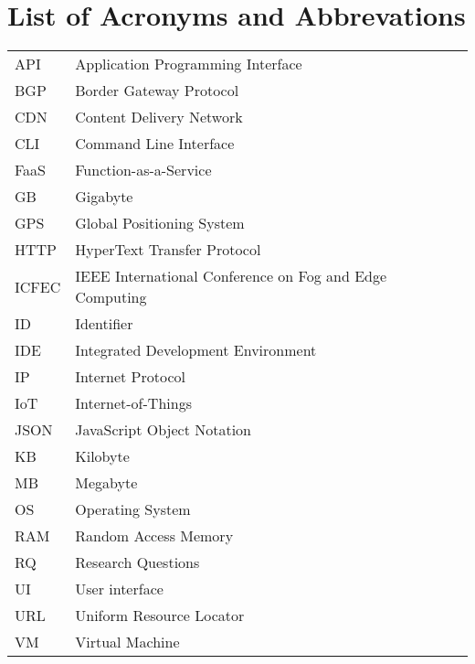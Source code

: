 \chapter*{List of Acronyms and Abbrevations}
\begin{table}[H]
\begin{tabular}{p{2cm}l}
API    & Application Programming Interface                         \\[5pt]
BGP    & Border Gateway Protocol                                   \\[5pt]
CDN    & Content Delivery Network                                  \\[5pt]
CLI    & Command Line Interface                                    \\[5pt]
FaaS   & Function-as-a-Service                                     \\[5pt]
GB     & Gigabyte                                                  \\[5pt]
GPS    & Global Positioning System                                 \\[5pt]
HTTP   & HyperText Transfer Protocol                               \\[5pt]
ICFEC  & IEEE International Conference on Fog and Edge Computing   \\[5pt]
ID     & Identifier                                                \\[5pt]
IDE    & Integrated Development Environment                        \\[5pt]
IP     & Internet Protocol                                         \\[5pt]
IoT    & Internet-of-Things                                        \\[5pt]
JSON   & JavaScript Object Notation                                \\[5pt]
KB     & Kilobyte                                                  \\[5pt]
MB     & Megabyte                                                  \\[5pt]
OS     & Operating System                                          \\[5pt]
RAM    & Random Access Memory                                      \\[5pt]
RQ     & Research Questions                                        \\[5pt]
UI     & User interface                                            \\[5pt]
URL    & Uniform Resource Locator                                  \\[5pt]
VM     & Virtual Machine                                           \\[5pt]
\end{tabular}
\end{table}
